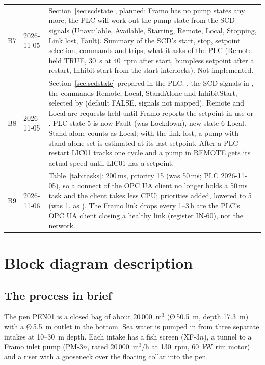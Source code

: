 \documentclass[11pt,a4paper]{article}
\begin{document}
\begin{small}
\begin{tabularx}{\textwidth}{@{}P{10mm}P{22mm}L@{}}
B7 & 2026-11-05 & Section~\ref{sec:scdstate}, planned: Framo has no pump states any more; the PLC will work out the pump state from the SCD signals (Unavailable, Available, Starting, Remote, Local, Stopping, Link lost, Fault). Summary of the SCD's start, stop, setpoint selection, commands and trips; what it asks of the PLC (Remote held TRUE, 30~s at 40~rpm after start, bumpless setpoint after a restart, Inhibit start from the start interlocks). Not implemented. \\
B8 & 2026-11-05 & Section~\ref{sec:scdstate} prepared in the PLC: , the SCD signals in , the commands Remote, Local, StandAlone and InhibitStart, selected by  (default FALSE, signals not mapped). Remote and Local are requests held until Framo reports the setpoint in use or . PLC state 5 is now Fault (was Lockdown), new state 6 Local. Stand-alone counts as Local; with the link lost, a pump with stand-alone set is estimated at its last setpoint. After a PLC restart LIC01 tracks one cycle and a pump in REMOTE gets its actual speed until LIC01 has a setpoint. \\
B9 & 2026-11-06 & Table~\ref{tab:tasks}:  200\,ms, priority 15 (was 50\,ms; PLC 2026-11-05), so a connect of the OPC UA client no longer holds a 50\,ms task and the client takes less CPU; priorities added,  lowered to 5 (was 1, as ). The Framo link drops every 1--3\,h are the PLC's OPC UA client closing a healthy link (register IN-60), not the network. \\
\end{tabularx}
\end{small}

\section{Block diagram description}
\label{sec:block}

\subsection{The process in brief}
The pen PEN01 is a closed bag of about 20\,000~m$^3$ (\O\,50.5~m, depth 17.3~m) with a
\O\,5.5~m outlet in the bottom. Sea water is pumped in from three separate intakes at 10--30~m
depth. Each intake has a fish screen (XF-3$n$), a tunnel to a Framo inlet pump (PM-3$n$, rated
20\,000~m$^3$/h at 130~rpm, 60~kW rim motor) and a riser with a gooseneck over the floating collar
into the pen.
\end{document}
